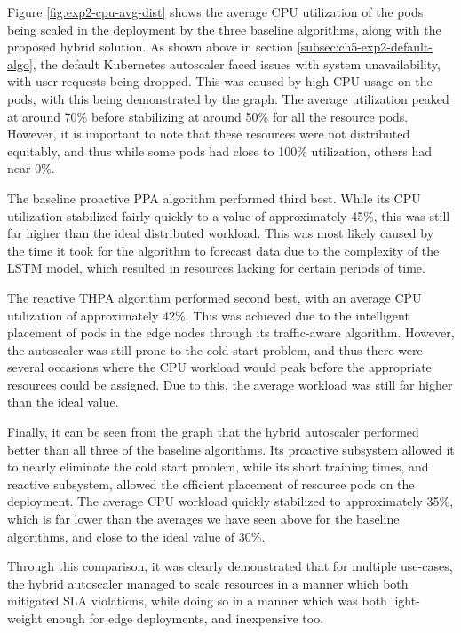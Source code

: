 Figure \ref{fig:exp2-cpu-avg-dist} shows the average CPU utilization of the pods being scaled in the deployment by the three baseline algorithms, along with the proposed hybrid solution. As shown above in section \ref{subsec:ch5-exp2-default-algo}, the default Kubernetes autoscaler faced issues with system unavailability, with user requests being dropped. This was caused by high CPU usage on the pods, with this being demonstrated by the graph. The average utilization peaked at around 70\% before stabilizing at around 50\% for all the resource pods. However, it is important to note that these resources were not distributed equitably, and thus while some pods had close to 100\% utilization, others had near 0\%.\par

The baseline proactive PPA algorithm performed third best. While its CPU utilization stabilized fairly quickly to a value of approximately 45\%, this was still far higher than the ideal distributed workload. This was most likely caused by the time it took for the algorithm to forecast data due to the complexity of the LSTM model, which resulted in resources lacking for certain periods of time.\par

The reactive THPA algorithm performed second best, with an average CPU utilization of approximately 42\%. This was achieved due to the intelligent placement of pods in the edge nodes through its traffic-aware algorithm. However, the autoscaler was still prone to the cold start problem, and thus there were several occasions where the CPU workload would peak before the appropriate resources could be assigned. Due to this, the average workload was still far higher than the ideal value.\par

Finally, it can be seen from the graph that the hybrid autoscaler performed better than all three of the baseline algorithms. Its proactive subsystem allowed it to nearly eliminate the cold start problem, while its short training times, and reactive subsystem, allowed the efficient placement of resource pods on the deployment. The average CPU workload quickly stabilized to approximately 35\%, which is far lower than the averages we have seen above for the baseline algorithms, and close to the ideal value of 30\%.\par

Through this comparison, it was clearly demonstrated that for multiple use-cases, the hybrid autoscaler managed to scale resources in a manner which both mitigated SLA violations, while doing so in a manner which was both light-weight enough for edge deployments, and inexpensive too.\par

